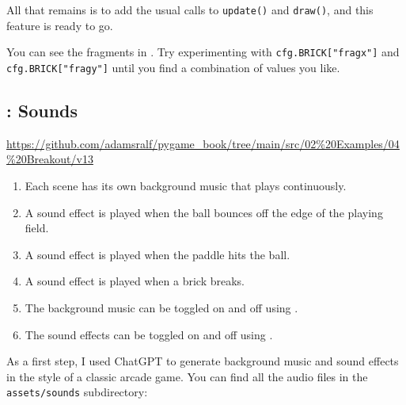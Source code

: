 
All that remains is to add the usual calls to \texttt{update()} and \texttt{draw()}, and this feature is ready to go.



You can see the fragments in . Try experimenting with \verb=cfg.BRICK["fragx"]= and \verb=cfg.BRICK["fragy"]= until you find a combination of values you like.

\newpage
\subsection{: Sounds}

\begin{diskbox}
	\url{https://github.com/adamsralf/pygame_book/tree/main/src/02%20Examples/04%20Breakout/v13}
\end{diskbox}

\begin{enumerate}
	\item Each scene has its own background music that plays continuously.
	\item A sound effect is played when the ball bounces off the edge of the playing field.
	\item A sound effect is played when the paddle hits the ball.
	\item A sound effect is played when a brick breaks.
	\item The background music can be toggled on and off using .
	\item The sound effects can be toggled on and off using .
\end{enumerate}
\er

As a first step, I used ChatGPT to generate background music and sound effects in the style of a classic arcade game. You can find all the audio files in the \texttt{assets/sounds} subdirectory:

